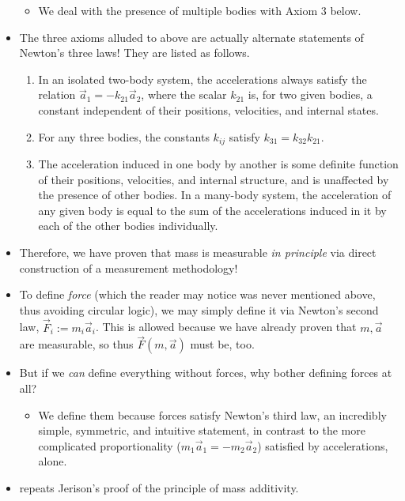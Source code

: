 \documentclass[../notes.tex]{subfiles}
\begin{document}
\begin{itemize}
\begin{itemize}
        \item We deal with the presence of multiple bodies with Axiom 3 below.
    \end{itemize}
    \item The three axioms alluded to above are actually alternate statements of Newton's three laws! They are listed as follows.
    \begin{enumerate}
        \item In an isolated two-body system, the accelerations always satisfy the relation $\vec{a}_1=-k_{21}\vec{a}_2$, where the scalar $k_{21}$ is, for two given bodies, a constant independent of their positions, velocities, and internal states.
        \item For any three bodies, the constants $k_{ij}$ satisfy $k_{31}=k_{32}k_{21}$.
        \item The acceleration induced in one body by another is some definite function of their positions, velocities, and internal structure, and is unaffected by the presence of other bodies. In a many-body system, the acceleration of any given body is equal to the sum of the accelerations induced in it by each of the other bodies individually.
    \end{enumerate}
    \item Therefore, we have proven that mass is measurable \emph{in principle} via direct construction of a measurement methodology!
    \item To define \emph{force} (which the reader may notice was never mentioned above, thus avoiding circular logic), we may simply define it via Newton's second law, $\vec{F}_i:=m_i\vec{a}_i$. This is allowed because we have already proven that $m,\vec{a}$ are measurable, so thus $\vec{F}(m,\vec{a})$ must be, too.
    \item But if we \emph{can} define everything without forces, why bother defining forces at all?
    \begin{itemize}
        \item We define them because forces satisfy Newton's third law, an incredibly simple, symmetric, and intuitive statement, in contrast to the more complicated proportionality ($m_1\vec{a}_1=-m_2\vec{a}_2$) satisfied by accelerations, alone.
    \end{itemize}
    \item \textcite{bib:KibbleBerkshire} repeats Jerison's proof of the principle of mass additivity.
\end{itemize}
\end{document}
